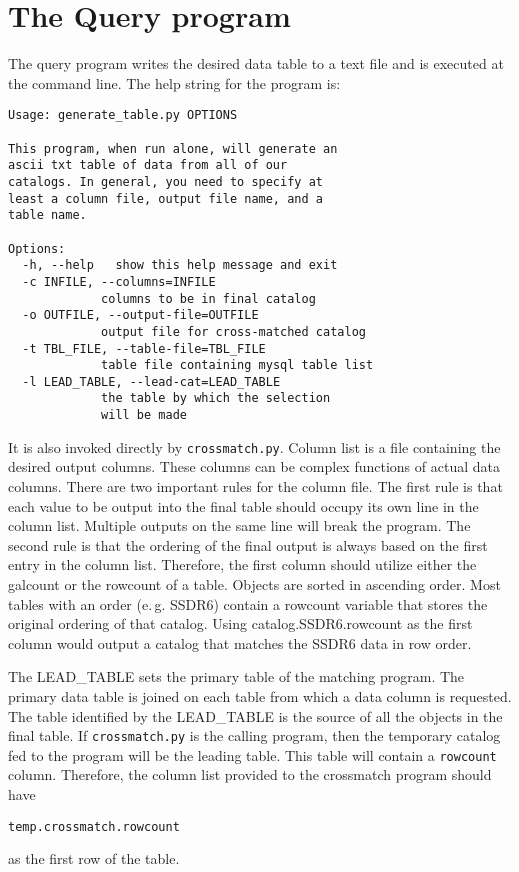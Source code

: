 \documentclass[useAMS,usenatbib,usegraphicx]{./mn2e}
\newcommand{\eg}{e.\,g. }
\begin{document}
\section{The Query program}\label{query_program}
The query program writes the desired data table to a text file and is executed at the command line. The help string for the program is:
\begin{verbatim}
Usage: generate_table.py OPTIONS

This program, when run alone, will generate an
ascii txt table of data from all of our 
catalogs. In general, you need to specify at 
least a column file, output file name, and a 
table name.

Options:
  -h, --help   show this help message and exit
  -c INFILE, --columns=INFILE
             columns to be in final catalog
  -o OUTFILE, --output-file=OUTFILE
             output file for cross-matched catalog
  -t TBL_FILE, --table-file=TBL_FILE
             table file containing mysql table list
  -l LEAD_TABLE, --lead-cat=LEAD_TABLE
             the table by which the selection 
             will be made
\end{verbatim} 
It is also invoked directly by \texttt{crossmatch.py}. Column list is a file containing the desired output columns. These columns can be complex functions of actual data columns. There are two important rules for the column file. The first rule is that each value to be output into the final table should occupy its own line in the column list. Multiple outputs on the same line will break the program. The second rule is that the ordering of the final output is always based on the first entry in the column list. Therefore, the first column should utilize either the galcount or the rowcount of a table. Objects are sorted in ascending order. Most tables with an order (\eg SSDR6) contain a rowcount variable that stores the original ordering of that catalog. Using catalog.SSDR6.rowcount as the first column would output a catalog that matches the SSDR6 data in row order. 

The LEAD\_TABLE sets the primary table of the matching program. The primary data table is joined on each table from which a data column is requested. The table  identified by the LEAD\_TABLE is the source of all the objects in the final table. If \texttt{crossmatch.py} is the calling program, then the temporary catalog fed to the program will be the leading table. This table will contain a \texttt{rowcount} column. Therefore, the column list provided to the crossmatch program should have 
\begin{verbatim}
temp.crossmatch.rowcount
\end{verbatim} 
as the first row of the table.
\end{document}
